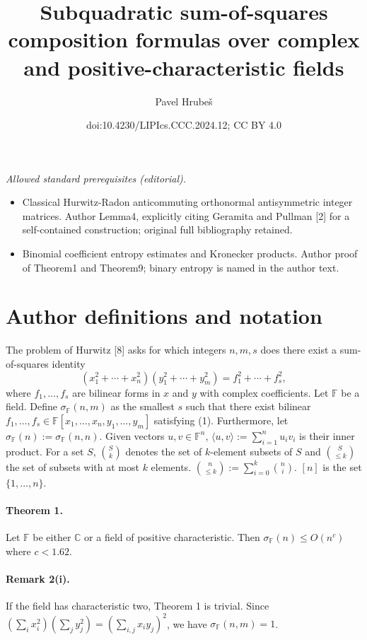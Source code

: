 \documentclass[10pt,a4paper]{article}
\title{Subquadratic sum-of-squares composition formulas over complex and positive-characteristic fields}
\author{Pavel Hrubeš}
\date{doi:10.4230/LIPIcs.CCC.2024.12; CC BY 4.0}
\begin{document}
\maketitle
\noindent\textit{Allowed standard prerequisites (editorial).}\begin{itemize}
\item Classical Hurwitz-Radon anticommuting orthonormal antisymmetric integer matrices. Author Lemma4, explicitly citing Geramita and Pullman [2] for a self-contained construction; original full bibliography retained.
\item Binomial coefficient entropy estimates and Kronecker products. Author proof of Theorem1 and Theorem9; binary entropy is named in the author text.
\end{itemize}\medskip
\section*{Author definitions and notation}
The problem of Hurwitz [8] asks for which integers $n,m,s$ does there exist a sum-of-squares identity
\begin{equation}\label{SOS1}
(x_1^2+\cdots+x_n^2)(y_1^2+\cdots+y_m^2)=f_1^2+\cdots+f_s^2,
\end{equation}
where $f_1,\ldots,f_s$ are bilinear forms in $x$ and $y$ with complex coefficients.
Let $\mathbb F$ be a field. Define $\sigma_{\mathbb F}(n,m)$ as the smallest $s$ such that there exist bilinear $f_1,\ldots,f_s\in\mathbb F[x_1,\ldots,x_n,y_1,\ldots,y_m]$ satisfying (1). Furthermore, let $\sigma_{\mathbb F}(n):=\sigma_{\mathbb F}(n,n)$.
Given vectors $u,v\in\mathbb F^n$, $\langle u,v\rangle:=\sum_{i=1}^n u_iv_i$ is their inner product. For a set $S$, $\binom Sk$ denotes the set of $k$-element subsets of $S$ and $\binom S{\le k}$ the set of subsets with at most $k$ elements. $\binom n{\le k}:=\sum_{i=0}^k\binom ni$. $[n]$ is the set $\{1,\ldots,n\}$.

\paragraph{Theorem 1.} Let $\mathbb F$ be either $\mathbb C$ or a field of positive characteristic. Then $\sigma_{\mathbb F}(n)\le O(n^c)$ where $c<1.62$.

\paragraph{Remark 2(i).} If the field has characteristic two, Theorem 1 is trivial. Since $(\sum_i x_i^2)(\sum_j y_j^2)=(\sum_{i,j}x_i y_j)^2$, we have $\sigma_{\mathbb F}(n,m)=1$.
\end{document}
